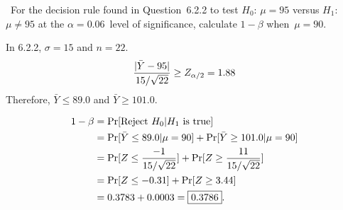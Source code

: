 \begin{problem}
  ~For the decision rule found in Question~6.2.2 to test $H_0$: ${\mu = 95}$ versus $H_1$: ${\mu \ne 95}$ at the ${\alpha = 0.06}$~level of significance, calculate ${1 - \beta}$ when~${\mu = 90}$.
\end{problem}

In 6.2.2, ${\sigma = 15}$ and ${n =22}$.
\begin{equation}
  \frac{\lvert\bar{Y} - 95\rvert}{15 / \sqrt{22}} \geq Z_{\alpha/2} = 1.88
\end{equation}
\noindent
Therefore, ${\bar{Y} \leq 89.0}$ and ${\bar{Y} \geq 101.0}$.

\noindent
\begin{align*}
  1 - \beta &= \Pr\lbrack\text{Reject } H_0 \vert H_1 \text{ is true}\rbrack \\
            &= \Pr\lbrack\bar{Y} \leq 89.0 \vert \mu = 90\rbrack + \Pr\lbrack\bar{Y} \geq 101.0 \vert \mu = 90\rbrack \\
            &= \Pr\lbrack Z \leq \frac{-1}{15 / \sqrt{22}}\rbrack + \Pr\lbrack Z \geq \frac{11}{15 / \sqrt{22}}\rbrack \\
            &= \Pr\lbrack Z \leq -0.31\rbrack + \Pr\lbrack Z \geq 3.44\rbrack \\
            &= 0.3783 + 0.0003 = \boxed{0.3786}\text{.}
\end{align*}
